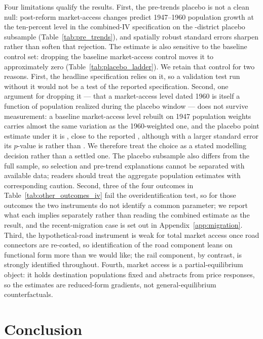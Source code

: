 Four limitations qualify the results. First, the pre-trends placebo
is not a clean null: post-reform market-access changes predict
1947--1960 population growth at the ten-percent level in the
combined-IV specification on the
\placeboNIVBoth{}-district placebo subsample
(Table~\ref{tab:pre_trends}), and spatially robust standard errors
sharpen rather than soften that rejection. The estimate is also
sensitive to the baseline control set: dropping the baseline
market-access control moves it to approximately zero
(Table~\ref{tab:placebo_ladder}). We retain that control for two
reasons. First, the headline specification relies on it, so a
validation test run without it would not be a test of the reported
specification. Second, one argument for dropping it --- that a
market-access level dated 1960 is itself a function of population
realized during the placebo window --- does not survive measurement:
a baseline market-access level rebuilt on 1947 population weights
carries almost the same variation as the 1960-weighted one, and the
placebo point estimate under it is \placeboMAwtCoef{}, close to the
reported \placeboCoefIVBoth{}, although with a larger standard error
its $p$-value is \placeboMAwtP{} rather than \placeboIVBP{}. We
therefore treat the choice as a stated modelling decision rather than
a settled one. The placebo
subsample also differs
from the full sample, so selection and pre-trend explanations cannot
be separated with available data; readers should treat the aggregate
population estimates with corresponding caution. Second, three of the four
outcomes in Table~\ref{tab:other_outcomes_iv} fail the
overidentification test, so for those outcomes the two instruments do
not identify a common parameter; we report what each implies
separately rather than reading the combined estimate as the result,
and the recent-migration case is set out in
Appendix~\ref{app:migration}. Third, the
hypothetical-road instrument is weak for total market access once
road connectors are re-costed, so identification of the road
component leans on functional form more than we would like; the rail
component, by contrast, is strongly identified throughout. Fourth,
market access is a partial-equilibrium object: it holds destination
populations fixed and abstracts from price responses, so the
estimates are reduced-form gradients, not general-equilibrium
counterfactuals.

\section{Conclusion}
\label{sec:conclusion}

